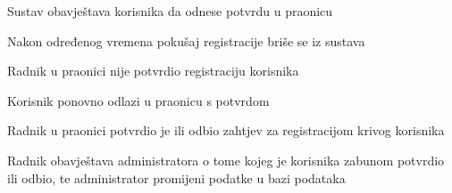 \begin{packed_item}
\begin{packed_item}
\begin{packed_enum}
			\item Sustav obavještava korisnika da odnese potvrdu u praonicu
			\item Nakon određenog vremena pokušaj registracije briše se iz sustava
			
		\end{packed_enum}
		
		\item[5.a] Radnik u praonici nije potvrdio registraciju korisnika
		\item[] \begin{packed_enum}
			
			\item Korisnik ponovno odlazi u praonicu s potvrdom
			
		\end{packed_enum}
		
		\item[5.a] Radnik u praonici potvrdio je ili odbio zahtjev za registracijom krivog korisnika
		\item[] \begin{packed_enum}
			
			\item Radnik obavještava administratora o tome kojeg je korisnika zabunom potvrdio ili odbio, te administrator promijeni podatke u bazi podataka
			
		\end{packed_enum}
		
		
	\end{packed_item}	
\end{packed_item}

